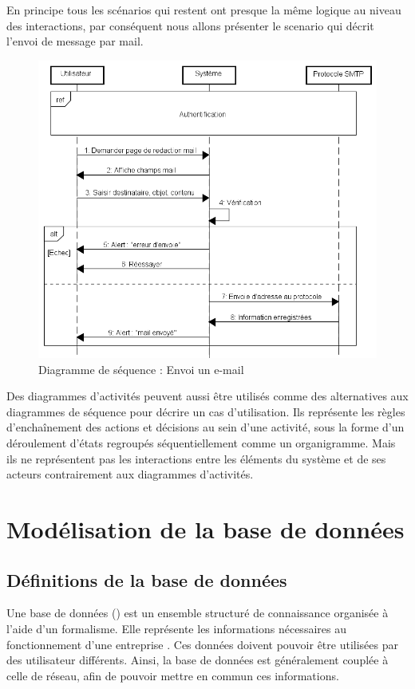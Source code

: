 \clearpage

En principe tous les scénarios qui restent ont presque la même logique au niveau des interactions, par conséquent nous allons présenter le scenario qui décrit l'envoi de message par mail.
\medskip

\begin{figure}[h]
	\centering
	\includegraphics[width=1\linewidth]{"Chapitre3/images/sd/Envoi message"}
	\caption{Diagramme de séquence : Envoi un e-mail}
	\label{Diagramme de séquence : Envoi un e-mail}
\end{figure}

Des diagrammes d'activités peuvent aussi être utilisés comme des alternatives aux
diagrammes de séquence pour décrire un cas d'utilisation. Ils représente les règles d'enchaînement des actions et décisions au sein d'une activité, sous la forme d’un déroulement d'états regroupés séquentiellement comme un organigramme. Mais ils ne représentent pas les interactions entre les éléments du système et de ses acteurs contrairement aux diagrammes d'activités.

\section{Modélisation de la base de données}

\subsection{Définitions de la base de données}
Une base de données () est un ensemble structuré de connaissance organisée à l'aide d'un formalisme. Elle représente les informations nécessaires au fonctionnement d'une entreprise \cite{bdMenja}. Ces données doivent pouvoir être utilisées par des utilisateur différents. Ainsi, la base de données est généralement couplée à celle de réseau, afin de pouvoir mettre en commun ces informations.


